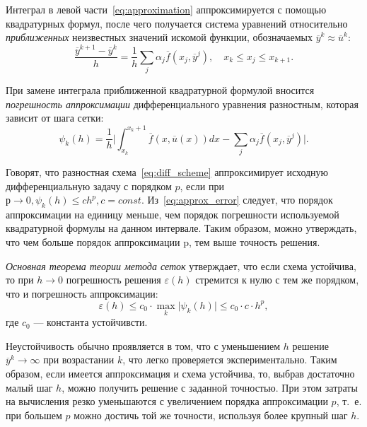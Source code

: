 \pagebreak

Интеграл в левой части~\eqref{eq:approximation} аппроксимируется с помощью
квадратурных формул, после чего получается система уравнений относительно
\emph{приближенных} неизвестных значений искомой функции,
обозначаемых \( \overline{y}^k \approx \overline{u}^k \):
\begin{equation}
  \dfrac{\overline{y}^{k+1} - \overline{y}^{k}}{h} =
  \dfrac{1}{h} \sum_j \alpha_j \overline{f}(x_j, \overline{y}^j), \quad
  x_k \le x_j \le x_{k+1}.
  \label{eq:diff_scheme}
\end{equation}

При замене интеграла приближенной квадратурной формулой вносится
\emph{погрешность аппроксимации} дифференциального уравнения разностным,
которая зависит от шага сетки:
\begin{equation}
  \psi_k(h) = \dfrac{1}{h}
  \Bigg|
  \int^{x_k+1}_{x_k} \overline{f}(x, \overline{u}(x))dx
  - \sum_j \alpha_j \overline{f}(x_j, \overline{y}^j)
  \Bigg|.
  \label{eq:approx_error}
\end{equation}

Говорят, что разностная схема~\eqref{eq:diff_scheme} аппроксимирует
исходную дифференциальную задачу с порядком \( p \), если при
\( р \rightarrow 0, \psi_k(h) \le ch^p, c=const \).
Из~\eqref{eq:approx_error} следует, что порядок аппроксимации
на единицу меньше, чем порядок погрешности используемой квадратурной формулы
на данном интервале. Таким образом, можно утверждать, что
чем больше порядок аппроксимации p, тем выше точность решения.

\emph{Основная теорема теории метода сеток} утверждает, что если схема
устойчива, то при \( h \rightarrow 0 \) погрешность решения \( \varepsilon(h) \)
стремится к нулю с тем же порядком, что и погрешность аппроксимации:
\begin{equation*}
  \varepsilon(h) \le
  c_0 \cdot \max_k \big| \psi_k(h) \big| \le
  c_0 \cdot c \cdot h^p,
\end{equation*}
где \( c_0 \) --- константа устойчивсти.

Неустойчивость обычно проявляется в том, что с уменьшением \( h \) решение
\( \overline{y}^k \rightarrow \infty \) при возрастании \( k \),
что легко проверяется экспериментально.
Таким образом, если имеется аппроксимация и схема устойчива, то, выбрав
достаточно малый шаг \( h \), можно получить решение с заданной точностью.
При этом затраты на вычисления резко уменьшаются с увеличением порядка
аппроксимации \( p \), т.~е. при большем \( p \) можно достичь той же точности,
используя более крупный шаг \( h \).


